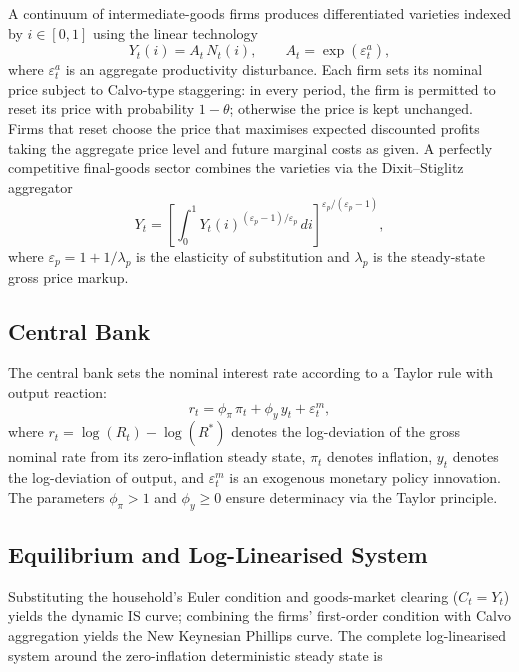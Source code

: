 A continuum of intermediate-goods firms produces differentiated varieties
indexed by $i\in[0,1]$ using the linear technology
\begin{equation}
  Y_{t}(i)=A_{t}\,N_{t}(i),\qquad A_{t}=\exp\!\left(\varepsilon_{t}^{a}\right),
  \label{eq:production}
\end{equation}
where $\varepsilon_{t}^{a}$ is an aggregate productivity disturbance.
Each firm sets its nominal price subject to Calvo-type staggering: in
every period, the firm is permitted to reset its price with probability
$1-\theta$; otherwise the price is kept unchanged. Firms that reset
choose the price that maximises expected discounted profits taking the
aggregate price level and future marginal costs as given. A perfectly
competitive final-goods sector combines the varieties via the
Dixit--Stiglitz aggregator
\begin{equation}
  Y_{t}=\left[\int_{0}^{1}Y_{t}(i)^{(\varepsilon_{p}-1)/\varepsilon_{p}}\,di\right]^{\varepsilon_{p}/(\varepsilon_{p}-1)},
  \label{eq:final-good}
\end{equation}
where $\varepsilon_{p}=1+1/\lambda_{p}$ is the elasticity of substitution
and $\lambda_{p}$ is the steady-state gross price markup.

\subsection{Central Bank}
\label{sec:model_cb}

The central bank sets the nominal interest rate according to a Taylor
rule with output reaction:
\begin{equation}
  r_{t}=\phi_{\pi}\,\pi_{t}+\phi_{y}\,y_{t}+\varepsilon_{t}^{m},
  \label{eq:taylor}
\end{equation}
where $r_{t}=\log(R_{t})-\log(R^{\ast})$ denotes the log-deviation of
the gross nominal rate from its zero-inflation steady state, $\pi_{t}$
denotes inflation, $y_{t}$ denotes the log-deviation of output, and
$\varepsilon_{t}^{m}$ is an exogenous monetary policy innovation. The
parameters $\phi_{\pi}>1$ and $\phi_{y}\ge 0$ ensure determinacy via the
Taylor principle.

\subsection{Equilibrium and Log-Linearised System}
\label{sec:model_eq}

Substituting the household's Euler condition and goods-market clearing
($C_{t}=Y_{t}$) yields the dynamic IS curve; combining the firms'
first-order condition with Calvo aggregation yields the New Keynesian
Phillips curve. The complete log-linearised system around the
zero-inflation deterministic steady state is

